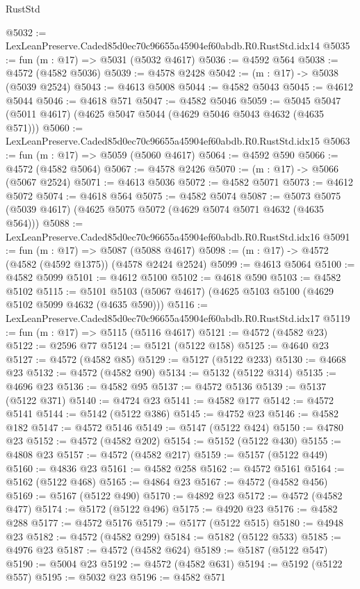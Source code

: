 \begin{lexlean}{RustStd}
\begin{coremodule}
@5032 := LexLeanPreserve.Caded85d0ec70c96655a45904ef60abdb.R0.RustStd.idx14
@5035 := fun (m : @17) => @5031 (@5032 @4617)
@5036 := @4592 @564
@5038 := @4572 (@4582 @5036)
@5039 := @4578 @2428
@5042 := (m : @17) -> @5038 (@5039 @2524)
@5043 := @4613 @5008
@5044 := @4582 @5043
@5045 := @4612 @5044
@5046 := @4618 @571
@5047 := @4582 @5046
@5059 := @5045 @5047 (@5011 @4617) (@4625 @5047 @5044 (@4629 @5046 @5043 @4632 (@4635 @571)))
@5060 := LexLeanPreserve.Caded85d0ec70c96655a45904ef60abdb.R0.RustStd.idx15
@5063 := fun (m : @17) => @5059 (@5060 @4617)
@5064 := @4592 @590
@5066 := @4572 (@4582 @5064)
@5067 := @4578 @2426
@5070 := (m : @17) -> @5066 (@5067 @2524)
@5071 := @4613 @5036
@5072 := @4582 @5071
@5073 := @4612 @5072
@5074 := @4618 @564
@5075 := @4582 @5074
@5087 := @5073 @5075 (@5039 @4617) (@4625 @5075 @5072 (@4629 @5074 @5071 @4632 (@4635 @564)))
@5088 := LexLeanPreserve.Caded85d0ec70c96655a45904ef60abdb.R0.RustStd.idx16
@5091 := fun (m : @17) => @5087 (@5088 @4617)
@5098 := (m : @17) -> @4572 (@4582 (@4592 @1375)) (@4578 @2424 @2524)
@5099 := @4613 @5064
@5100 := @4582 @5099
@5101 := @4612 @5100
@5102 := @4618 @590
@5103 := @4582 @5102
@5115 := @5101 @5103 (@5067 @4617) (@4625 @5103 @5100 (@4629 @5102 @5099 @4632 (@4635 @590)))
@5116 := LexLeanPreserve.Caded85d0ec70c96655a45904ef60abdb.R0.RustStd.idx17
@5119 := fun (m : @17) => @5115 (@5116 @4617)
@5121 := @4572 (@4582 @23)
@5122 := @2596 @77
@5124 := @5121 (@5122 @158)
@5125 := @4640 @23
@5127 := @4572 (@4582 @85)
@5129 := @5127 (@5122 @233)
@5130 := @4668 @23
@5132 := @4572 (@4582 @90)
@5134 := @5132 (@5122 @314)
@5135 := @4696 @23
@5136 := @4582 @95
@5137 := @4572 @5136
@5139 := @5137 (@5122 @371)
@5140 := @4724 @23
@5141 := @4582 @177
@5142 := @4572 @5141
@5144 := @5142 (@5122 @386)
@5145 := @4752 @23
@5146 := @4582 @182
@5147 := @4572 @5146
@5149 := @5147 (@5122 @424)
@5150 := @4780 @23
@5152 := @4572 (@4582 @202)
@5154 := @5152 (@5122 @430)
@5155 := @4808 @23
@5157 := @4572 (@4582 @217)
@5159 := @5157 (@5122 @449)
@5160 := @4836 @23
@5161 := @4582 @258
@5162 := @4572 @5161
@5164 := @5162 (@5122 @468)
@5165 := @4864 @23
@5167 := @4572 (@4582 @456)
@5169 := @5167 (@5122 @490)
@5170 := @4892 @23
@5172 := @4572 (@4582 @477)
@5174 := @5172 (@5122 @496)
@5175 := @4920 @23
@5176 := @4582 @288
@5177 := @4572 @5176
@5179 := @5177 (@5122 @515)
@5180 := @4948 @23
@5182 := @4572 (@4582 @299)
@5184 := @5182 (@5122 @533)
@5185 := @4976 @23
@5187 := @4572 (@4582 @624)
@5189 := @5187 (@5122 @547)
@5190 := @5004 @23
@5192 := @4572 (@4582 @631)
@5194 := @5192 (@5122 @557)
@5195 := @5032 @23
@5196 := @4582 @571

\end{coremodule}
\end{lexlean}
